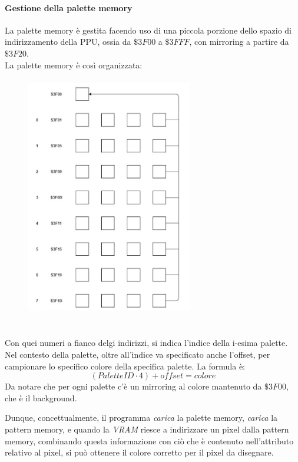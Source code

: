 \documentclass[11pt]{article}
\begin{document}
\paragraph{Gestione della palette memory}
La palette memory è gestita facendo uso di una piccola porzione dello spazio di indirizzamento della PPU, ossia da $\$3F00$ a $\$3FFF$, con mirroring a partire da $\$3F20$.\\
La palette memory è così organizzata:
\begin{figure}[h]
\centering
\includegraphics[width=275px, height=400px]{PALETTE_STORING.jpg}
\end{figure}\\
Con quei numeri a fianco delgi indirizzi, si indica l'indice della i-esima palette. Nel contesto della palette, oltre all'indice va specificato anche l'offset, per campionare lo specifico colore della specifica palette. La formula è:
\[
	(PaletteID\cdot 4)+offset=colore
\]
Da notare che per ogni palette c'è un mirroring al colore mantenuto da $\$3F00$, che è il background.

Dunque, concettualmente, il programma \emph{carica} la palette memory, \emph{carica} la pattern memory, e quando la \emph{VRAM} riesce a indirizzare un pixel dalla pattern memory, combinando questa informazione con ciò che è contenuto nell'attributo relativo al pixel, si può ottenere il colore corretto per il pixel da disegnare.
\end{document}
